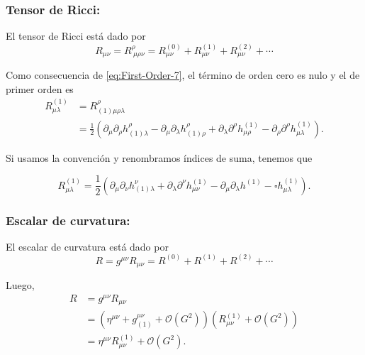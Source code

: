 \documentclass[letterpaper,11pt]{article}
\begin{document}
\subsubsection*{Tensor de Ricci:}

El tensor de Ricci está dado por
\begin{equation}
R_{\mu\nu} = R^{\rho}_{\ \mu\rho\nu} = R_{\mu\nu}^{(0)} + R_{\mu\nu}^{(1)} + R_{\mu\nu}^{(2)} + \cdots 
\end{equation}

Como consecuencia de \eqref{eq:First-Order-7}, el término de orden cero es nulo y el de primer orden es
\begin{align}
R^{(1)}_{\mu\lambda} &= R^{\rho}_{(1)\mu\rho\lambda} \nonumber \\
&= \frac{1}{2} \left(\partial_{\mu} \partial_{\rho} h_{(1)\lambda}^{\rho} -\partial_{\mu} \partial_{\lambda} h_{(1)\rho}^{\rho} + \partial_{\lambda} \partial^{\rho} h_{\mu\rho}^{(1)} - \partial_{\rho} \partial^{\rho} h_{\mu\lambda}^{(1)}  \right). 
\end{align}

Si usamos la convención y renombramos índices de suma, tenemos que
\begin{shaded}
\begin{equation}
R^{(1)}_{\mu\lambda} = \frac{1}{2} \left(\partial_{\mu} \partial_{\nu} h_{(1)\lambda}^{\nu} + \partial_{\lambda} \partial^{\nu} h_{\mu\nu}^{(1)}  -\partial_{\mu} \partial_{\lambda} h^{(1)}  - \square h_{\mu\lambda}^{(1)}  \right). \label{eq:First-Order-8}
\end{equation}
\end{shaded}

\subsubsection*{Escalar de curvatura:}

El escalar de curvatura está dado por
\begin{equation}
R = g^{\mu\nu} R_{\mu\nu} = R^{(0)} + R^{(1)} + R^{(2)} + \cdots
\end{equation}

Luego, 
\begin{align}
R &= g^{\mu\nu} R_{\mu\nu} \\
&= \left(\eta^{\mu\nu} + g_{(1)}^{ \mu\nu} + \mathcal{O}(G^2)\right) \left(R_{\mu\nu}^{(1)} + \mathcal{O}(G^2) \right) \\
&= \eta^{\mu\nu} R_{\mu\nu}^{(1)} + \mathcal{O}(G^2).
\end{align}
\end{document}
